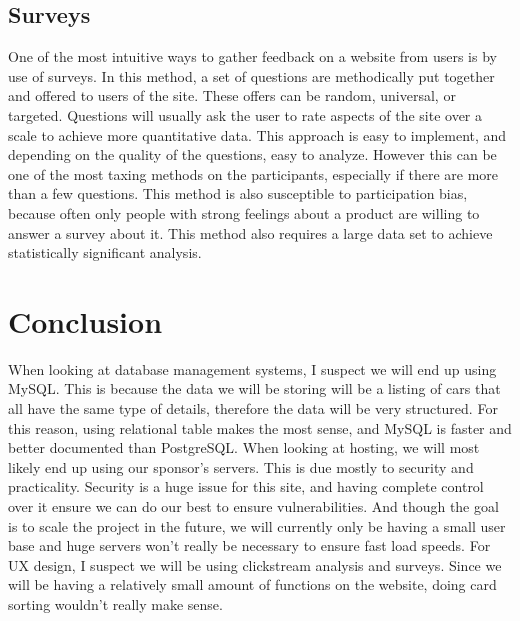 \documentclass[onecolumn, draftclsnofoot,10pt, compsoc]{IEEEtran}
\begin{document}
    \subsection{Surveys}
    
        One of the most intuitive ways to gather feedback on a website from users is by use of surveys. 
        In this method, a set of questions are methodically put together and offered to users of the site. 
        These offers can be random, universal, or targeted. 
        Questions will usually ask the user to rate aspects of the site over a scale to achieve more quantitative data\cite{e8}. 
        This approach is easy to implement, and depending on the quality of the questions, easy to analyze. 
        However this can be one of the most taxing methods on the participants, especially if there are more than a few questions.
        This method is also susceptible to participation bias, because often only people with strong feelings about a product are willing to answer a survey about it.
        This method also requires a large data set to achieve statistically significant analysis.
        
\section{Conclusion}

    When looking at database management systems, I suspect we will end up using MySQL.
    This is because the data we will be storing will be a listing of cars that all have the same type of details, therefore the data will be very structured.
    For this reason, using relational table makes the most sense, and MySQL is faster and better documented than PostgreSQL.
    When looking at hosting, we will most likely end up using our sponsor's servers.
    This is due mostly to security and practicality.
    Security is a huge issue for this site, and having complete control over it ensure we can do our best to ensure vulnerabilities.
    And though the goal is to scale the project in the future, we will currently only be having a small user base and huge servers won't really be necessary to ensure fast load speeds.
    For UX design, I suspect we will be using clickstream analysis and surveys. 
    Since we will be having a relatively small amount of functions on the website, doing card sorting wouldn't really make sense.



\end{document}
